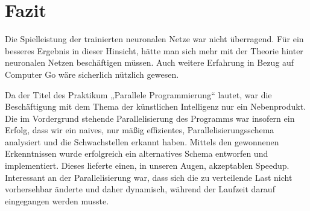 \section{Fazit}

Die Spielleistung der trainierten neuronalen Netze war nicht überragend. Für
ein besseres Ergebnis in dieser Hinsicht, hätte man sich mehr mit der Theorie
hinter neuronalen Netzen beschäftigen müssen. Auch weitere Erfahrung in Bezug
auf Computer Go wäre sicherlich nützlich gewesen.

Da der Titel des Praktikum „Parallele Programmierung“ lautet, war die
Beschäftigung mit dem Thema der künstlichen Intelligenz nur ein Nebenprodukt.
Die im Vordergrund stehende Parallelisierung des Programms war insofern ein
Erfolg, dass wir ein naives, nur mäßig effizientes, Parallelisierungsschema
analysiert und die Schwachstellen erkannt haben.  Mittels den gewonnenen
Erkenntnissen wurde erfolgreich ein alternatives Schema entworfen und
implementiert. Dieses lieferte einen, in unseren Augen, akzeptablen
Speedup. Interessant an der Parallelisierung war, dass sich die zu verteilende
Last nicht vorhersehbar änderte und daher dynamisch, während der Laufzeit
darauf eingegangen werden musste.
